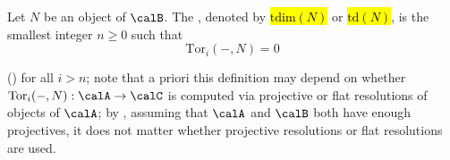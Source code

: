 \begin{definition}
\begin{enumerate}
        Let $N$ be an object of $\calB$. The , denoted by \hl{$\mathrm{tdim}(N)$} or \hl{$\mathrm{td}(N)$}, is the smallest integer $n \geq 0$ such that 
        $$\mathrm{Tor}_i(-,N) = 0$$

        ()
        for all $i > n$; note that a priori this definition may depend on whether $\mathrm{Tor}_i(-,N): \calA \to \calC$ is computed via projective or flat resolutions of objects of $\calA$; by , assuming that $\calA$ and $\calB$ both have enough projectives, it does not matter whether projective resolutions or flat resolutions are used. 


    \end{enumerate}
\end{definition}


    

